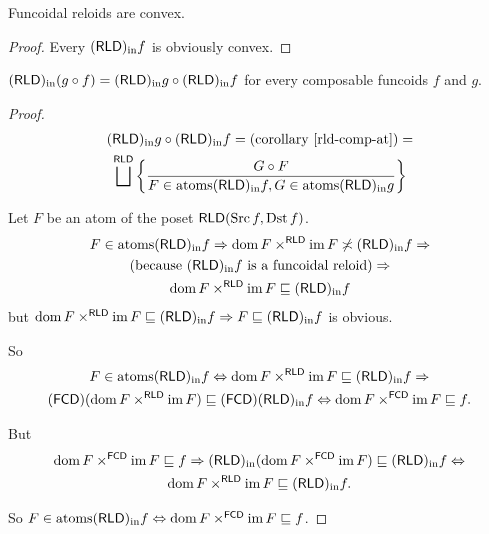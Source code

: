 \begin{cor}
Funcoidal reloids are convex.\end{cor}
\begin{proof}
Every $(\mathsf{RLD})_{\mathrm{in}} f$ is obviously convex.\end{proof}
\begin{thm}\label{rldin-dist}
$(\mathsf{RLD})_{\mathrm{in}}(g\circ f)=(\mathsf{RLD})_{\mathrm{in}} g\circ(\mathsf{RLD})_{\mathrm{in}} f$ for every composable
funcoids $f$ and $g$.\end{thm}
\begin{proof}
~
\begin{multline*}
\torldin g\circ\torldin f=\text{(corollary \ref{rld-comp-at})}=\\
\bigsqcup^{\mathsf{RLD}}\setcond{G\circ F}{F\in\atoms\torldin f,G\in\atoms\torldin g}
\end{multline*}


Let $F$ be an atom of the poset $\mathsf{RLD}(\operatorname{Src} f,\operatorname{Dst} f)$.
\begin{multline*}
F\in\operatorname{atoms}(\mathsf{RLD})_{\mathrm{in}} f\Rightarrow\operatorname{dom} F\times^{\mathsf{RLD}}\operatorname{im} F\not\asymp(\mathsf{RLD})_{\mathrm{in}} f\Rightarrow\\
\text{(because \ensuremath{(\mathsf{RLD})_{\mathrm{in}} f} is a funcoidal reloid)}\Rightarrow\\
\operatorname{dom} F\times^{\mathsf{RLD}}\operatorname{im} F\sqsubseteq(\mathsf{RLD})_{\mathrm{in}} f
\end{multline*}
but $\operatorname{dom} F\times^{\mathsf{RLD}}\operatorname{im} F\sqsubseteq(\mathsf{RLD})_{\mathrm{in}} f\Rightarrow F\sqsubseteq(\mathsf{RLD})_{\mathrm{in}} f$
is obvious.

So 
\begin{multline*}
F\in\operatorname{atoms}(\mathsf{RLD})_{\mathrm{in}} f\Leftrightarrow\operatorname{dom} F\times^{\mathsf{RLD}}\operatorname{im} F\sqsubseteq(\mathsf{RLD})_{\mathrm{in}} f\Rightarrow\\
(\mathsf{FCD})(\operatorname{dom} F\times^{\mathsf{RLD}}\operatorname{im} F)\sqsubseteq(\mathsf{FCD})(\mathsf{RLD})_{\mathrm{in}} f\Leftrightarrow\operatorname{dom} F\times^{\mathsf{FCD}}\operatorname{im} F\sqsubseteq f.
\end{multline*}


But 
\begin{multline*}
\operatorname{dom} F\times^{\mathsf{FCD}}\operatorname{im} F\sqsubseteq f\Rightarrow(\mathsf{RLD})_{\mathrm{in}}(\operatorname{dom} F\times^{\mathsf{FCD}}\operatorname{im} F)\sqsubseteq(\mathsf{RLD})_{\mathrm{in}} f\Leftrightarrow\\
\operatorname{dom} F\times^{\mathsf{RLD}}\operatorname{im} F\sqsubseteq(\mathsf{RLD})_{\mathrm{in}} f.
\end{multline*}


So $F\in\operatorname{atoms}(\mathsf{RLD})_{\mathrm{in}} f\Leftrightarrow\operatorname{dom} F\times^{\mathsf{FCD}}\operatorname{im} F\sqsubseteq f$.


\end{proof}
